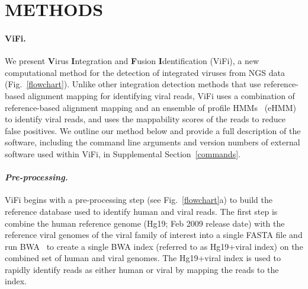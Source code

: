 \documentclass[a4,center,fleqn]{NAR}
\begin{document}
\section{METHODS}
\paragraph{\textbf{ViFi.}}
We present \textbf{V}irus \textbf{I}ntegration and \textbf{F}usion \textbf{I}dentification (ViFi), a new computational method for the detection of integrated viruses from NGS data (Fig.~\ref{flowchart}).  Unlike other integration detection methods that use reference-based alignment mapping for identifying viral reads, ViFi uses a combination of reference-based alignment mapping and an ensemble of profile HMMs~\cite{Nguyen2016_hippi} (eHMM) to identify viral reads, and uses the mappability scores of the reads to reduce false positives.  We outline our method below and provide a full description of the software, including the command line arguments and version numbers of external software used within ViFi, in Supplemental Section~\ref{commands}. 



\paragraph{\emph{Pre-processing.}} ViFi begins with a pre-processing step (see Fig.~\ref{flowchart}a) to build the reference database used to identify human and viral reads.  The first step is combine the human reference genome (Hg19; Feb 2009 release date) with the reference viral genomes of the viral family of interest into a single FASTA file and run BWA~\cite{Li2009} to create a single BWA index (referred to as Hg19+viral index) on the combined set of human and viral genomes.  The Hg19+viral index is used to rapidly identify reads as either human or viral by mapping the reads to the index.  
\end{document}
